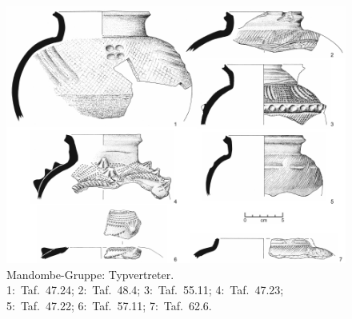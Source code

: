 \begin{figure}[!tb]
	\centering
	\includegraphics[width=\textwidth]{fig/MDB-Typen.pdf}
	\caption{Mandombe-Gruppe: Typvertreter.\\1:~Taf.~47.24; 2:~Taf.~48.4; 3:~Taf.~55.11; 4:~Taf.~47.23; 5:~Taf.~47.22; 6:~Taf.~57.11; 7:~Taf.~62.6.}
	\label{fig:MDB_Typverteter}
\end{figure}

